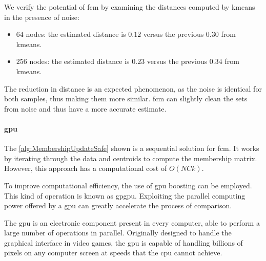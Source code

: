 \noindent We verify the potential of \gls{fcm} by examining the distances computed by \gls{kmeans} in the presence of noise:
\begin{itemize}
	\item $64$ nodes: the estimated distance is $0.12$ versus the previous $0.30$ from \gls{kmeans}.
	\item $256$ nodes: the estimated distance is $0.23$ versus the previous $0.34$  from \gls{kmeans}.
\end{itemize}
The reduction in distance is an expected phenomenon, as the noise is identical for both samples, thus making them more similar. \gls{fcm} can slightly clean the sets from noise and thus have a more accurate estimate.

\paragraph{\gls{gpu}}
\noindent The \cref{alg:MembershipUpdateSafe} shown is a sequential solution for \gls{fcm}. It works by iterating through the data and centroids to compute the membership matrix. However, this approach has a computational cost of $O(NCk)$.

\noindent To improve computational efficiency, the use of \gls{gpu} \gls{boost}ing can be employed. This kind of operation is known as \gls{gpgpu}. Exploiting the parallel computing power offered by a \gls{gpu} can greatly accelerate the process of comparison.

\noindent The \gls{gpu} is an electronic component present in every computer, able to perform a large number of operations in parallel. Originally designed to handle the graphical interface in video games, the \gls{gpu} is capable of handling billions of pixels on any computer screen at speeds that the \gls{cpu} cannot achieve.

